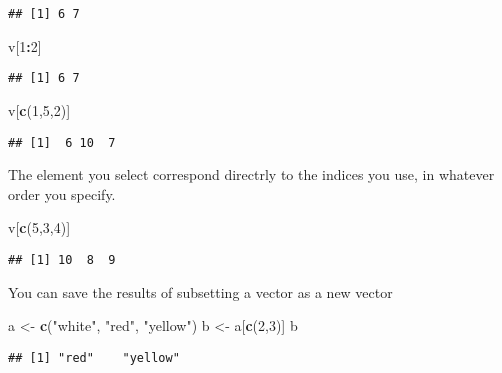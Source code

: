 \documentclass[
]{article}
\newenvironment{Shaded}{\begin{snugshade}}{\end{snugshade}}
\newcommand{\DecValTok}[1]{\textcolor[rgb]{0.00,0.00,0.81}{#1}}
\newcommand{\KeywordTok}[1]{\textcolor[rgb]{0.13,0.29,0.53}{\textbf{#1}}}
\newcommand{\NormalTok}[1]{#1}
\newcommand{\OperatorTok}[1]{\textcolor[rgb]{0.81,0.36,0.00}{\textbf{#1}}}
\newcommand{\StringTok}[1]{\textcolor[rgb]{0.31,0.60,0.02}{#1}}
\begin{document}
\begin{verbatim}
## [1] 6 7
\end{verbatim}

\begin{Shaded}
\begin{Highlighting}[]
\NormalTok{v[}\DecValTok{1}\OperatorTok{:}\DecValTok{2}\NormalTok{]}
\end{Highlighting}
\end{Shaded}

\begin{verbatim}
## [1] 6 7
\end{verbatim}

\begin{Shaded}
\begin{Highlighting}[]
\NormalTok{v[}\KeywordTok{c}\NormalTok{(}\DecValTok{1}\NormalTok{,}\DecValTok{5}\NormalTok{,}\DecValTok{2}\NormalTok{)]}
\end{Highlighting}
\end{Shaded}

\begin{verbatim}
## [1]  6 10  7
\end{verbatim}

The element you select correspond directrly to the indices you use, in
whatever order you specify.

\begin{Shaded}
\begin{Highlighting}[]
\NormalTok{v[}\KeywordTok{c}\NormalTok{(}\DecValTok{5}\NormalTok{,}\DecValTok{3}\NormalTok{,}\DecValTok{4}\NormalTok{)]}
\end{Highlighting}
\end{Shaded}

\begin{verbatim}
## [1] 10  8  9
\end{verbatim}

You can save the results of subsetting a vector as a new vector

\begin{Shaded}
\begin{Highlighting}[]
\NormalTok{a <-}\StringTok{ }\KeywordTok{c}\NormalTok{(}\StringTok{"white"}\NormalTok{, }\StringTok{"red"}\NormalTok{, }\StringTok{"yellow"}\NormalTok{)}
\NormalTok{b <-}\StringTok{ }\NormalTok{a[}\KeywordTok{c}\NormalTok{(}\DecValTok{2}\NormalTok{,}\DecValTok{3}\NormalTok{)]}
\NormalTok{b}
\end{Highlighting}
\end{Shaded}

\begin{verbatim}
## [1] "red"    "yellow"
\end{verbatim}
\end{document}
